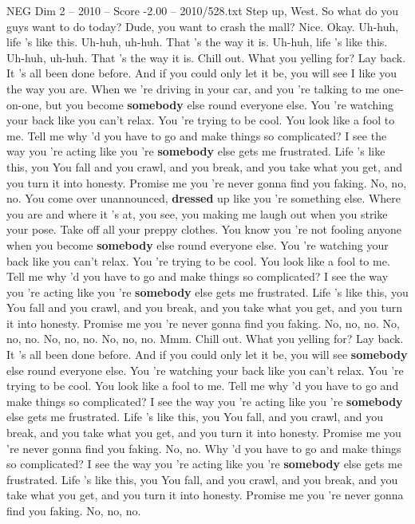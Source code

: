 \begin{textsample}{NEG Dim 2 – 2010 – Score -2.00 – 2010/528.txt}  \label{ex:f2_neg_017}
Step up, West.
So what do you guys want to do today?
Dude, you want to crash the mall?
Nice.
Okay.
Uh-huh, life 's like this.
Uh-huh, uh-huh.
That 's the way it is.
Uh-huh, life 's like this.
Uh-huh, uh-huh.
That 's the way it is.
Chill out.
What you yelling for?
Lay back.
It 's all been done before.
And if you could only let it be, you will see I like you the way you are.
When we 're driving in your car, and you 're talking to me one-on-one, but you become \textbf{somebody} else round everyone else.
You 're watching your back like you can't relax.
You 're trying to be cool.
You look like a fool to me.
Tell me why 'd you have to go and make things so complicated?
I see the way you 're acting like you 're \textbf{somebody} else gets me frustrated.
Life 's like this, you You fall and you crawl, and you break, and you take what you get, and you turn it into honesty.
Promise me you 're never gonna find you faking.
No, no, no.
You come over unannounced, \textbf{dressed} up like you 're something else.
Where you are and where it 's at, you see, you making me laugh out when you strike your pose.
Take off all your preppy clothes.
You know you 're not fooling anyone when you become \textbf{somebody} else round everyone else.
You 're watching your back like you can't relax.
You 're trying to be cool.
You look like a fool to me.
Tell me why 'd you have to go and make things so complicated?
I see the way you 're acting like you 're \textbf{somebody} else gets me frustrated.
Life 's like this, you You fall and you crawl, and you break, and you take what you get, and you turn it into honesty.
Promise me you 're never gonna find you faking.
No, no, no.
No, no, no.
No, no, no.
No, no, no.
Mmm.
Chill out.
What you yelling for?
Lay back.
It 's all been done before.
And if you could only let it be, you will see \textbf{somebody} else round everyone else.
You 're watching your back like you can't relax.
You 're trying to be cool.
You look like a fool to me.
Tell me why 'd you have to go and make things so complicated?
I see the way you 're acting like you 're \textbf{somebody} else gets me frustrated.
Life 's like this, you You fall, and you crawl, and you break, and you take what you get, and you turn it into honesty.
Promise me you 're never gonna find you faking.
No, no.
Why 'd you have to go and make things so complicated?
I see the way you 're acting like you 're \textbf{somebody} else gets me frustrated.
Life 's like this, you You fall, and you crawl, and you break, and you take what you get, and you turn it into honesty.
Promise me you 're never gonna find you faking.
No, no, no.

\end{textsample}
